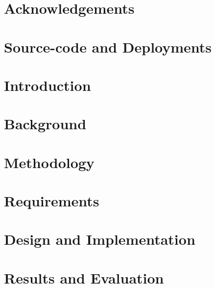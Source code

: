 
\chapter{Acknowledgements}


\chapter{Source-code and Deployments}\label{ch0:source_and_deployments}


\mainmatter

\chapter{Introduction}\label{ch1:intro}


\chapter{Background}\label{ch2:background}


\chapter{Methodology}\label{ch3:method}


\chapter{Requirements}\label{ch4:requirements}


\chapter{Design and Implementation}\label{ch5:design}


\chapter{Results and Evaluation}\label{ch6:results}


